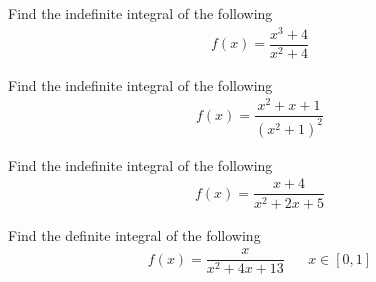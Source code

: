 \begin{exercise}
Find the indefinite integral of the following
\begin{align*}
    f(x) = \dfrac{x^{3} + 4}{x^{2} + 4}
\end{align*}
\end{exercise}

\begin{exercise}
Find the indefinite integral of the following
\begin{align*}
    f(x) = \dfrac{x^{2} + x + 1}{(x^{2} + 1)^{2}}
\end{align*}
\end{exercise}

\begin{exercise}
Find the indefinite integral of the following
\begin{align*}
    f(x) = \dfrac{x + 4}{x^{2} + 2x + 5}
\end{align*}
\end{exercise}

\begin{exercise}
Find the definite integral of the following
\begin{align*}
    f(x) = \dfrac{x}{x^{2} + 4x + 13} \hspace{20pt} x \in [0, 1]
\end{align*}
\end{exercise}

